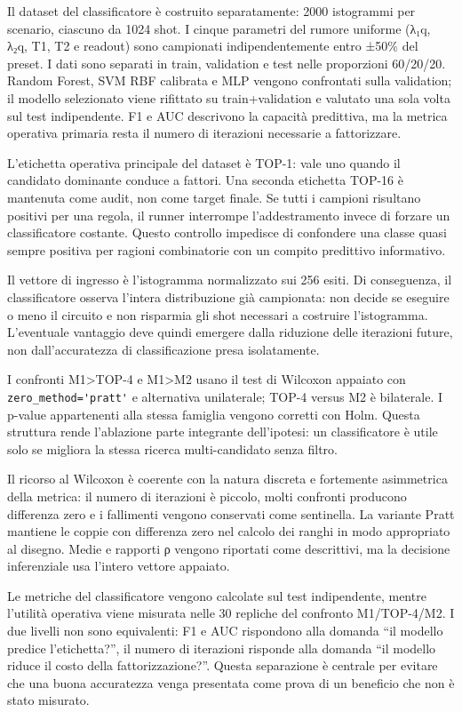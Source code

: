 Il dataset del classificatore è costruito separatamente: 2000 istogrammi per scenario, ciascuno da 1024 shot. I cinque parametri del rumore uniforme (λ₁q, λ₂q, T1, T2 e readout) sono campionati indipendentemente entro ±50\% del preset. I dati sono separati in train, validation e test nelle proporzioni 60/20/20. Random Forest, SVM RBF calibrata e MLP vengono confrontati sulla validation; il modello selezionato viene rifittato su train+validation e valutato una sola volta sul test indipendente. F1 e AUC descrivono la capacità predittiva, ma la metrica operativa primaria resta il numero di iterazioni necessarie a fattorizzare.

L'etichetta operativa principale del dataset è TOP-1: vale uno quando il candidato dominante conduce a fattori. Una seconda etichetta TOP-16 è mantenuta come audit, non come target finale. Se tutti i campioni risultano positivi per una regola, il runner interrompe l'addestramento invece di forzare un classificatore costante. Questo controllo impedisce di confondere una classe quasi sempre positiva per ragioni combinatorie con un compito predittivo informativo.

Il vettore di ingresso è l'istogramma normalizzato sui 256 esiti. Di conseguenza, il classificatore osserva l'intera distribuzione già campionata: non decide se eseguire o meno il circuito e non risparmia gli shot necessari a costruire l'istogramma. L'eventuale vantaggio deve quindi emergere dalla riduzione delle iterazioni future, non dall'accuratezza di classificazione presa isolatamente.

I confronti M1\textgreater TOP-4 e M1\textgreater M2 usano il test di Wilcoxon appaiato con \verb|zero_method='pratt'| e alternativa unilaterale; TOP-4 versus M2 è bilaterale. I p-value appartenenti alla stessa famiglia vengono corretti con Holm. Questa struttura rende l'ablazione parte integrante dell'ipotesi: un classificatore è utile solo se migliora la stessa ricerca multi-candidato senza filtro.

Il ricorso al Wilcoxon è coerente con la natura discreta e fortemente asimmetrica della metrica: il numero di iterazioni è piccolo, molti confronti producono differenza zero e i fallimenti vengono conservati come sentinella. La variante Pratt mantiene le coppie con differenza zero nel calcolo dei ranghi in modo appropriato al disegno. Medie e rapporti ρ vengono riportati come descrittivi, ma la decisione inferenziale usa l'intero vettore appaiato.

Le metriche del classificatore vengono calcolate sul test indipendente, mentre l'utilità operativa viene misurata nelle 30 repliche del confronto M1/TOP-4/M2. I due livelli non sono equivalenti: F1 e AUC rispondono alla domanda ``il modello predice l'etichetta?'', il numero di iterazioni risponde alla domanda ``il modello riduce il costo della fattorizzazione?''. Questa separazione è centrale per evitare che una buona accuratezza venga presentata come prova di un beneficio che non è stato misurato.

